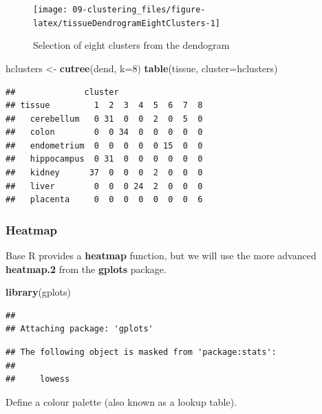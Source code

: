 \documentclass[]{book}
\newenvironment{Shaded}{\begin{snugshade}}{\end{snugshade}}
\newcommand{\KeywordTok}[1]{\textcolor[rgb]{0.13,0.29,0.53}{\textbf{{#1}}}}
\newcommand{\DataTypeTok}[1]{\textcolor[rgb]{0.13,0.29,0.53}{{#1}}}
\newcommand{\DecValTok}[1]{\textcolor[rgb]{0.00,0.00,0.81}{{#1}}}
\newcommand{\StringTok}[1]{\textcolor[rgb]{0.31,0.60,0.02}{{#1}}}
\newcommand{\NormalTok}[1]{{#1}}
\theoremstyle{definition}
\theoremstyle{definition}
\theoremstyle{definition}
\theoremstyle{remark}
\begin{document}
\begin{figure}

{\centering \texttt{[image: 09-clustering\_files/figure-latex/tissueDendrogramEightClusters-1]} 

}

\caption{Selection of eight clusters from the dendogram}\label{fig:tissueDendrogramEightClusters}
\end{figure}

\begin{Shaded}
\begin{Highlighting}[]
\NormalTok{hclusters <-}\StringTok{ }\KeywordTok{cutree}\NormalTok{(dend, }\DataTypeTok{k=}\DecValTok{8}\NormalTok{)}
\KeywordTok{table}\NormalTok{(tissue, }\DataTypeTok{cluster=}\NormalTok{hclusters)}
\end{Highlighting}
\end{Shaded}

\begin{verbatim}
##              cluster
## tissue         1  2  3  4  5  6  7  8
##   cerebellum   0 31  0  0  2  0  5  0
##   colon        0  0 34  0  0  0  0  0
##   endometrium  0  0  0  0  0 15  0  0
##   hippocampus  0 31  0  0  0  0  0  0
##   kidney      37  0  0  0  2  0  0  0
##   liver        0  0  0 24  2  0  0  0
##   placenta     0  0  0  0  0  0  0  6
\end{verbatim}

\subsubsection{Heatmap}\label{heatmap}

Base R provides a \textbf{heatmap} function, but we will use the more
advanced \textbf{heatmap.2} from the \textbf{gplots} package.

\begin{Shaded}
\begin{Highlighting}[]
\KeywordTok{library}\NormalTok{(gplots)}
\end{Highlighting}
\end{Shaded}

\begin{verbatim}
## 
## Attaching package: 'gplots'
\end{verbatim}

\begin{verbatim}
## The following object is masked from 'package:stats':
## 
##     lowess
\end{verbatim}

Define a colour palette (also known as a lookup table).
\end{document}
